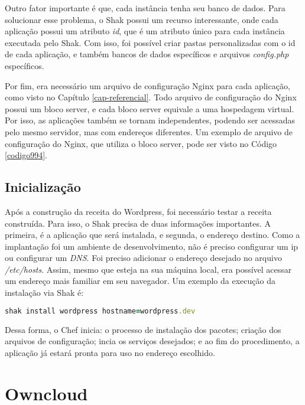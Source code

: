 Outro fator importante é que, cada instância
tenha seu banco de dados. Para
solucionar esse problema, o Shak possui um recurso interessante, onde cada aplicação
possui um atributo \textit{id}, que é um atributo único para cada instância executada pelo
Shak. Com isso, foi possível criar pastas personalizadas com o id de cada aplicação, 
e também bancos de dados específicos e arquivos \textit{config.php} específicos.

Por fim, era necessário um arquivo de configuração Nginx para cada aplicação,
como visto no Capítulo \ref{cap-referencial}. Todo arquivo de configuração
do Nginx possui um bloco server, e cada bloco server equivale a uma hospedagem virtual. 
Por isso, as aplicações também se tornam independentes, podendo ser acessadas pelo 
mesmo servidor, mas com endereços diferentes. Um exemplo de arquivo de configuração
do Nginx, que utiliza o bloco server, pode ser visto no Código \ref{codigo994}.

\subsection{Inicialização}

Após a construção da receita do Wordpress, foi necessário testar a receita construída. 
Para isso, o Shak precisa de duas informações importantes. A primeira, é a aplicação
que será instalada, e segunda, o endereço destino. Como a implantação foi um ambiente de desenvolvimento,
não é preciso configurar um ip ou configurar um \textit{DNS}. Foi preciso adicionar o
endereço desejado no arquivo \textit{/etc/hosts}. Assim, mesmo que esteja na sua máquina local, 
era possível acessar um endereço mais familiar em seu navegador. Um exemplo da execução
da instalação via Shak é:

\begin{lstlisting}[language=Ruby,label=dice_index,caption={Exemplo de execução de instalação do wordpress com shak}]
shak install wordpress hostname=wordpress.dev
\end{lstlisting}

Dessa forma, o Chef inicia: o processo de instalação dos pacotes; criação dos arquivos
de configuração; incia os serviços desejados; e ao fim do procedimento, a aplicação
já estará pronta para uso no endereço escolhido.

\section{Owncloud}
\label{sub:owncloud}

